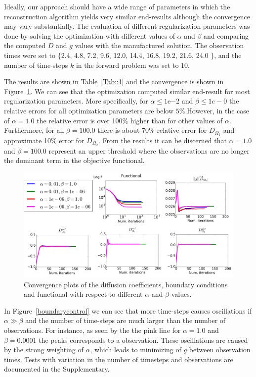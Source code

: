 \documentclass[12pt,a4paper]{article}
\begin{document}
Ideally, our approach should have a wide range of parameters in which the reconstruction algorithm yields very similar end-results although the convergence may vary substantially. The evaluation of different regularization parameters was done by solving the optimization with different values of $\alpha$ and $\beta$ and comparing the computed $D$ and $g$ values with the manufactured solution. The observation times were set to $\lbrace$2.4, 4.8, 7.2, 9.6, 12.0, 14.4, 16.8, 19.2, 21.6, 24.0 $\rbrace$, and the number of time-steps $k$ in the forward problem was set to $10$. 

The results are shown in Table~\ref{Tab::1} and the convergence is shown in Figure~\ref{convergence}. We can see that the optimization computed similar end-result for most regularization parameters. More specifically, for $\alpha \leq 1\mathrm{e}{-2}$ and $\beta \leq 1e-0$ the relative errors for all optimization parameters are below $5\%$.However, in the case of $ \alpha=1.0$ the relative error is over 100\% higher than for other values of $\alpha$. Furthermore, for all $\beta=100.0$ there is about 70\% relative error for $D_{\Omega_1}$ and approximate 10\% error for $D_{\Omega_2}$. From the results it can be discerned that $\alpha =1.0$ and $\beta=100.0$ represent an upper threshold where the observations are no longer the dominant term in the objective functional.  


\begin{figure}
\centering
\includegraphics[scale=0.18]{Convergence-plot.png}   
\caption{Convergence plots of the diffusion coefficients, boundary conditions and functional with respect to different $\alpha$ and $\beta$ values. } 
\label{convergence}
\end{figure}

In Figure~\ref{boundarycontrol} we can see that more time-steps causes oscillations if $\alpha\gg\beta$ and the number of time-steps are much larger than the number of observations. For instance, as seen by the the pink line for $\alpha=1.0$ and $\beta=0.0001$ the peaks corresponds to a observation. These oscillations are caused by the strong weighting of $\alpha$, which leads to minimizing of $g$ between observation times. 
Tests with variation in the number of timesteps and observations are documented in the Supplementary. 
\end{document}
